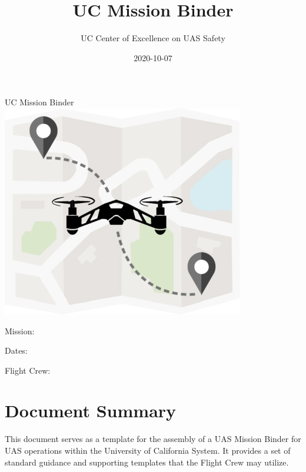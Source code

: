 \documentclass[
]{book}
\title{UC Mission Binder}
\author{UC Center of Excellence on UAS Safety}
\date{2020-10-07}
\let\oldmaketitle\maketitle
\begin{document}
\maketitle

\thispagestyle{empty}
\begin{center}
\vspace*{9em}
{\Huge UC Mission Binder}\\
\vspace*{9em}
\includegraphics{cover.jpg}\\
\vspace*{9em}
{\huge 

Mission: \hrulefill

Dates: \hrulefill

Flight Crew: \hrulefill

}
\vspace*{9em}
\end{center}

\let\maketitle\oldmaketitle

{
\setcounter{tocdepth}{1}
\tableofcontents
}
\hypertarget{document-summary}{%
\chapter*{Document Summary}\label{document-summary}}

This document serves as a template for the assembly of a UAS Mission Binder for UAS operations within the University of California System. It provides a set of standard guidance and supporting templates that the Flight Crew may utilize.
\end{document}
